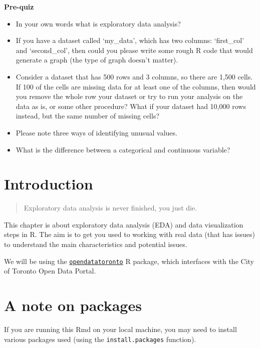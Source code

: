 \documentclass[
]{book}
\providecommand{\tightlist}{%
  \setlength{\itemsep}{0pt}\setlength{\parskip}{0pt}}
\begin{document}
\textbf{Pre-quiz}

\begin{itemize}
\tightlist
\item
  In your own words what is exploratory data analysis?
\item
  If you have a dataset called `my\_data', which has two columns: `first\_col' and `second\_col', then could you please write some rough R code that would generate a graph (the type of graph doesn't matter).
\item
  Consider a dataset that has 500 rows and 3 columns, so there are 1,500 cells. If 100 of the cells are missing data for at least one of the columns, then would you remove the whole row your dataset or try to run your analysis on the data as is, or some other procedure? What if your dataset had 10,000 rows instead, but the same number of missing cells?
\item
  Please note three ways of identifying unusual values.
\item
  What is the difference between a categorical and continuous variable?
\end{itemize}

\hypertarget{introduction-17}{%
\section{Introduction}\label{introduction-17}}

\begin{quote}
Exploratory data analysis is never finished, you just die.
\end{quote}

This chapter is about exploratory data analysis (EDA) and data visualization steps in R. The aim is to get you used to working with real data (that has issues) to understand the main characteristics and potential issues.

We will be using the \href{https://sharlagelfand.github.io/opendatatoronto/}{\texttt{opendatatoronto}} R package, which interfaces with the City of Toronto Open Data Portal.

\hypertarget{a-note-on-packages}{%
\section{A note on packages}\label{a-note-on-packages}}

If you are running this Rmd on your local machine, you may need to install various packages used (using the \texttt{install.packages} function).
\end{document}
